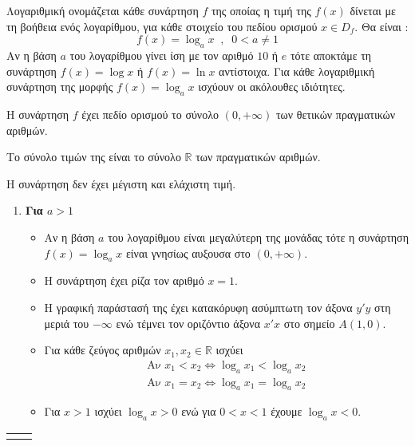 \documentclass[twoside,nofonts,internet,shmeiwseis]{thewria}
\begin{document}
\orismoi
{}
Λογαριθμική ονομάζεται κάθε συνάρτηση $ f $ της οποίας η τιμή της $ f(x) $ δίνεται με τη βοήθεια ενός λογαρίθμου, για κάθε στοιχείο του πεδίου ορισμού $ x\in D_f $. Θα είναι :
\[ f(x)=\log_ax\;\;,\;\;0<a\neq1 \]
Αν η βάση $ a $ του λογαρίθμου γίνει ίση με τον αριθμό $ 10 $ ή $ e $ τότε αποκτάμε τη συνάρτηση $ f(x)=\log{x} $ ή $ f(x)=\ln{x} $ αντίστοιχα.
\thewrhmata
{}
Για κάθε λογαριθμική συνάρτηση της μορφής $ f(x)=\log_{a}{x} $ ισχύουν οι ακόλουθες ιδιότητες.
\begin{rlist}
\item Η συνάρτηση $ f $ έχει πεδίο ορισμού το σύνολο $ (0,+\infty) $ των θετικών πραγματικών αριθμών.
\item Το σύνολο τιμών της είναι το σύνολο $ \mathbb{R} $ των πραγματικών αριθμών.
\item Η συνάρτηση δεν έχει μέγιστη και ελάχιστη τιμή.
\begin{enumerate}[itemsep=0mm,label=\bf\arabic*.,leftmargin=0cm]
\item \textbf{Για {\boldmath$ a>1 $}}
\begin{itemize}
\item Αν η βάση $ a $ του λογαρίθμου είναι μεγαλύτερη της μονάδας τότε η συνάρτηση $ f(x)=\log_{a}x $ είναι γνησίως αυξουσα στο $ (0,+\infty) $.
\item Η συνάρτηση έχει ρίζα τον αριθμό $ x=1 $.
\item Η γραφική παράστασή της έχει κατακόρυφη ασύμπτωτη τον άξονα $ y'y $ στη μεριά του $ -\infty $ ενώ τέμνει τον οριζόντιο άξονα $ x'x $ στο σημείο $ A(1,0) $.
\item Για κάθε ζεύγος αριθμών $ x_1,x_2\in\mathbb{R} $ ισχύει \begin{gather*}
\textrm{Αν }x_1<x_2\Leftrightarrow \log_{a}{x_1}<\log_{a}{x_2} \\
\textrm{Αν }x_1=x_2\Leftrightarrow \log_{a}{x_1}=\log_{a}{x_2}
\end{gather*}
\item Για $ x>1 $ ισχύει $ \log_{a}x>0 $ ενώ για $ 0<x<1 $ έχουμε $ \log_{a}x<0 $.
\end{itemize}
\end{enumerate}
\begin{center}
\begin{tabular}{p{6cm}p{6.2cm}}
\begin{tikzpicture}
\begin{axis}[x=.7cm,y=.7cm,aks_on,xmin=-.5,xmax=5,
ymin=-3,ymax=3.4,ticks=none,xlabel={\footnotesize $ x $},
ylabel={\footnotesize $ y $},belh ar]

\end{axis}
\end{tikzpicture}
\end{tabular}
\end{center}
\end{rlist}
\end{document}

